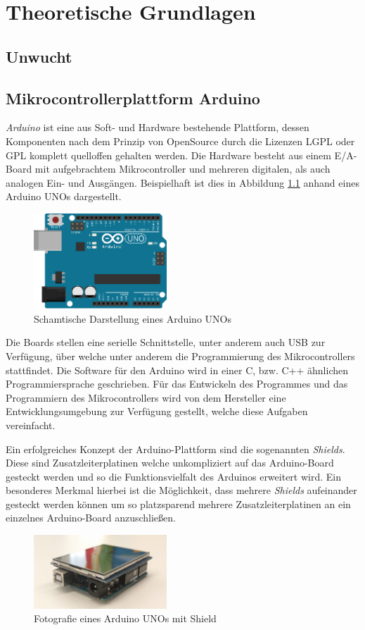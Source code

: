 
\chapter{Theoretische Grundlagen}

\section{Unwucht}

\section{Mikrocontrollerplattform Arduino}
\textit{Arduino} ist eine aus Soft- und Hardware bestehende Plattform, dessen Komponenten nach dem Prinzip von OpenSource durch die Lizenzen \ac{LGPL} oder \ac{GPL} komplett quelloffen gehalten werden.
Die Hardware besteht aus einem E/A-Board mit aufgebrachtem Mikrocontroller und mehreren digitalen, als auch analogen Ein- und Ausgängen.
Beispielhaft ist dies in Abbildung \ref{fig:arduino_uno_schema} anhand eines Arduino UNOs dargestellt.
\begin{figure}[H]
	\centering
	\includegraphics[width=5cm]{images/chapter/02/arduino_uno.png}
	\caption{Schamtische Darstellung eines Arduino UNOs}
	\label{fig:arduino_uno_schema}
\end{figure}
Die Boards stellen eine serielle Schnittstelle, unter anderem auch \ac{USB} zur Verfügung, über welche unter anderem die Programmierung des Mikrocontrollers stattfindet.
Die Software für den Arduino wird in einer C, bzw. C++ ähnlichen Programmiersprache geschrieben.
Für das Entwickeln des Programmes und das Programmiern des Mikrocontrollers wird von dem Hersteller eine Entwicklungsumgebung zur Verfügung gestellt, welche diese Aufgaben vereinfacht.

Ein erfolgreiches Konzept der Arduino-Plattform sind die sogenannten \textit{Shields}.
Diese sind Zusatzleiterplatinen welche unkompliziert auf das Arduino-Board gesteckt werden und so die Funktionsvielfalt des Arduinos erweitert wird.
Ein besonderes Merkmal hierbei ist die Möglichkeit, dass mehrere \textit{Shields} aufeinander gesteckt werden können um so platzsparend mehrere Zusatzleiterplatinen an ein einzelnes Arduino-Board anzuschließen.
\begin{figure}[H]
	\centering
	\includegraphics[width=5cm]{images/chapter/02/arduino_shield.jpg}
	\caption{Fotografie eines Arduino UNOs mit Shield}
	\label{fig:arduino_shield}
\end{figure}
